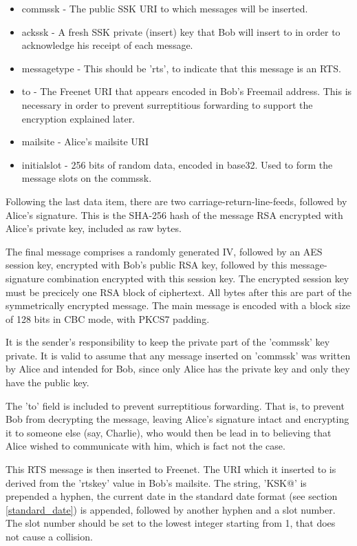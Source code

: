 \documentclass[12pt,a4paper]{article}
\begin{document}
\begin{itemize}
\item commssk - The public SSK URI to which messages will be inserted.
\item ackssk - A fresh SSK private (insert) key that Bob will insert to in order to acknowledge his
	receipt of each message.
\item messagetype - This should be 'rts', to indicate that this message is an RTS.
\item to - The Freenet URI that appears encoded in Bob's Freemail address. This is necessary in
	order to prevent surreptitious forwarding to support the encryption explained later.
\item mailsite - Alice's mailsite URI
\item initialslot - 256 bits of random data, encoded in base32. Used to form the message slots on
	the commssk.
\end{itemize}

Following the last data item, there are two carriage-return-line-feeds, followed by Alice's
signature. This is the SHA-256 hash of the message RSA encrypted with Alice's private key, included
as raw bytes.

The final message comprises a randomly generated IV, followed by an AES session key, encrypted with
Bob's public RSA key, followed by this message-signature combination encrypted with this session
key. The encrypted session key must be precicely one RSA block of ciphertext. All bytes after this
are part of the symmetrically encrypted message. The main message is encoded with a block size of
128 bits in CBC mode, with PKCS7 padding.

It is the sender's responsibility to keep the private part of the 'commssk' key private. It is valid
to assume that any message inserted on 'commssk' was written by Alice and intended for Bob, since
only Alice has the private key and only they have the public key.

The 'to' field is included to prevent surreptitious forwarding. That is, to prevent Bob from
decrypting the message, leaving Alice's signature intact and encrypting it to someone else (say,
Charlie), who would then be lead in to believing that Alice wished to communicate with him, which is
fact not the case.

This RTS message is then inserted to Freenet. The URI which it inserted to is derived from the
'rtskey' value in Bob's mailsite. The string, 'KSK@' is prepended a hyphen, the current date in the
standard date format (see section \ref{standard_date}) is appended, followed by another hyphen and a
slot number. The slot number should be set to the lowest integer starting from 1, that does not
cause a collision.
\end{document}

